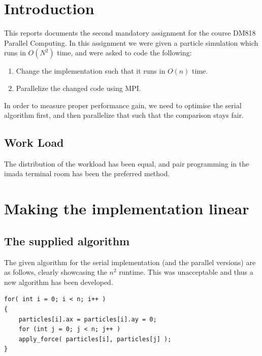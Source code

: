 \documentclass[a4paper,11pt,oneside]{book}
\begin{document}
\pagestyle{ruled}
\chapter{Introduction}
\setcounter{section}{1}
This reports documents the second mandatory assignment for the course DM818 Parallel Computing. In this assignment we were given a particle simulation which runs in $O(N^{2})$ time, and were asked to code the following:

\begin{enumerate}
\item Change the implementation such that it runs in $O(n)$ time.
\item Parallelize the changed code using MPI.
\end{enumerate}

In order to measure proper performance gain, we need to optimise the serial algorithm first, and then parallelize that such that the comparison stays fair.
 
\section{Work Load}
The distribution of the workload has been equal, and pair programming in the imada terminal room has been the preferred method.

\chapter{Making the implementation linear}
\section{The supplied algorithm}
The given algorithm for the serial implementation (and the parallel versions) are as follows, clearly showcasing the $n^{2}$ runtime. This was unacceptable and thus a new algorithm has been developed.

\begin{verbatim}
for( int i = 0; i < n; i++ )
{
	particles[i].ax = particles[i].ay = 0;
	for (int j = 0; j < n; j++ )
    apply_force( particles[i], particles[j] );
}
\end{verbatim}
\end{document}

